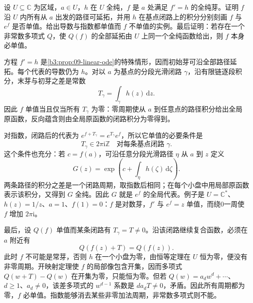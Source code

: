 \begin{exercise}\label{b3:ex:09-8}
设 \(U\subseteq\mathbb C\) 为区域，\(a\in U\)，\(h\) 在 \(U\) 全纯，\(f\) 是 \(a\) 处满足 \(f'=h\) 的全纯芽。证明 \(f\) 沿 \(U\) 内所有从 \(a\) 出发的路径可延拓，并用 \(h\) 在基点闭路上的积分分别刻画 \(f\) 与 \(e^f\) 是否单值。给出导数与指数都单值而 \(f\) 不单值的实例。最后证明：若存在一个非常数多项式 \(Q\)，使 \(Q(f)\) 的全部延拓由 \(U\) 上同一个全纯函数给出，则 \(f\) 本身必单值。
\end{exercise}
\begin{solution}
方程 \(f'=h\) 是\cref{b3:prop:09-linear-ode}的特殊情形，因而初始芽可沿全部路径延拓。每个代表的导数仍为 \(h\)。对以 \(a\) 为基点的分段光滑闭路 \(\gamma\)，沿有限链逐段积分，末芽与初芽之差是常数
\[
 T_\gamma=\int_\gamma h(z)\,\mathrm dz.
\]
因此 \(f\) 单值当且仅当所有 \(T_\gamma\) 为零：零周期使从 \(a\) 到任意点的路径积分给出全局原函数，反向蕴含则由全局原函数的闭路积分为零得到。

对指数，闭路后的代表为 \(e^{f+T_\gamma}=e^{T_\gamma}e^f\)，所以它单值的必要条件是
\[
 T_\gamma\in2\pi\mathrm i\mathbb Z
 \quad\text{对每条基点闭路 }\gamma.
\]
这个条件也充分：若 \(c=f(a)\)，可沿任意分段光滑路径 \(\eta\) 从 \(a\) 到 \(z\) 定义
\[
 G(z)=\exp\left(c+\int_\eta h(\zeta)\,\mathrm d\zeta\right).
\]
两条路径的积分之差是一个闭路周期，取指数后相同；在每个小盘中用局部原函数表示该积分，又得到 \(G\) 全纯。因此 \(G\) 就是 \(e^f\) 的全局代表。例子是 \(U=\mathbb C^*\)、\(h(z)=1/z\)、\(a=1\)、\(f(1)=0\)：\(f\) 是对数芽，\(f'\) 与 \(e^f=z\) 单值，而绕0一周使 \(f\) 增加 \(2\pi\mathrm i\)。

最后，设 \(Q(f)\) 单值而某条闭路有 \(T_\gamma=T\ne0\)。沿该闭路继续复合函数，必须在 \(a\) 附近有
\[
 Q(f(z)+T)=Q(f(z)).
\]
此时 \(f\) 不可能是常芽，否则 \(h\) 在一个小盘为零，由恒等定理在 \(U\) 恒为零，便没有非零周期。开映射定理使 \(f\) 的局部像包含开集，因而多项式 \(Q(w+T)-Q(w)\) 在开集为零，只能恒为零。但若 \(Q(w)=a_dw^d+\cdots\)、\(d\ge1\)、\(a_d\ne0\)，该差多项式的 \(w^{d-1}\) 系数是 \(d a_dT\ne0\)，矛盾。因此所有周期都为零，\(f\) 必单值。指数能够消去某些非零加法周期，非常数多项式则不能。
\end{solution}
